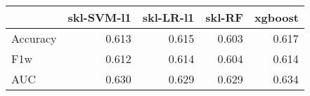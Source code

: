 \begin{tabular}{lrrrr}
\toprule
{} &  skl-SVM-l1 &  skl-LR-l1 &  skl-RF &  xgboost \\
\midrule
Accuracy &       0.613 &      0.615 &   0.603 &    0.617 \\
F1w      &       0.612 &      0.614 &   0.604 &    0.614 \\
AUC      &       0.630 &      0.629 &   0.629 &    0.634 \\
\bottomrule
\end{tabular}
